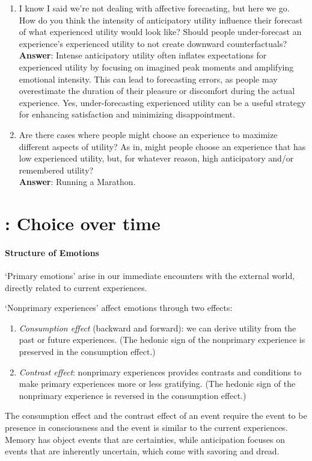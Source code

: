 \documentclass[11pt]{elegantbook}
\begin{document}
\begin{enumerate}
    \item I know I said we're not dealing with affective forecasting, but here we go. How do you think the intensity of anticipatory utility influence their forecast of what experienced utility would look like? Should people under-forecast an experience's experienced utility to not create downward counterfactuals?
    \textbf{Answer}: Intense anticipatory utility often inflates expectations for experienced utility by focusing on imagined peak moments and amplifying emotional intensity. This can lead to forecasting errors, as people may overestimate the duration of their pleasure or discomfort during the actual experience. Yes, under-forecasting experienced utility can be a useful strategy for enhancing satisfaction and minimizing disappointment.
    \item Are there cases where people might choose an experience to maximize different aspects of utility? As in, might people choose an experience that has low experienced utility, but, for whatever reason, high anticipatory and/or remembered utility?\\
    \textbf{Answer}: Running a Marathon.
\end{enumerate}

\section{\cite{loewenstein1992choice}: Choice over time}
\paragraph*{Structure of Emotions} `Primary emotions' arise in our immediate encounters with the external world, directly related to current experiences.

`Nonprimary experiences' affect emotions through two effects:
\begin{enumerate}
    \item \textit{Consumption effect} (backward and forward): we can derive utility from the past or future experiences. (The hedonic sign of the nonprimary experience is preserved in the consumption effect.)
    \item \textit{Contrast effect}: nonprimary experiences provides contrasts and conditions to make primary experiences more or less gratifying. (The hedonic sign of the nonprimary experience is reversed in the consumption effect.)
\end{enumerate}

The consumption effect and the contrast effect of an event require the event to be presence in consciousness and the event is similar to the current experiences. Memory has object events that are certainties, while anticipation focuses on events that are inherently uncertain, which come with savoring and dread.
\end{document}

